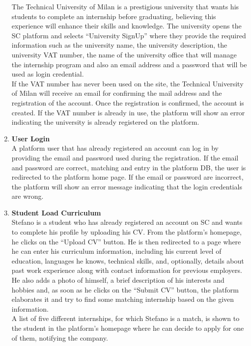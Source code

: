 \begin{enumerate}
        The Technical University of Milan is a prestigious university that wants his students to complete an internship before graduating, believing this experience will enhance their skills and knowledge. The university opens the SC platform and selects “University SignUp” where they provide the required information such as the university name, the university description, the university VAT number, the name of the university office that will manage the internship program and also an email address and a password that will be used as login credential.\\
        If the VAT number has never been used on the site, the Technical University of Milan will receive an email for confirming the mail address and the registration of the account. Once the registration is confirmed, the account is created.
        If the VAT number is already in use, the platform will show an error indicating the university is already registered on the platform.
    \item \textbf{\textcolor{titleColor}{User Login}}\\
        A platform user that has already registered an account can log in by providing the email and password used during the registration. If the email and password are correct, matching and entry in the platform DB, the user is redirected to the platform home page. If the email or password are incorrect, the platform will show an error message indicating that the login credentials are wrong.
    \item \textbf{\textcolor{titleColor}{Student Load Curriculum}}\\
        Stefano is a student who has already registered an account on SC and wants to complete his profile by uploading his CV. From the platform's homepage, he clicks on the “Upload CV” button. He is then redirected to a page where he can enter his curriculum information, including his current level of education, languages he knows, technical skills, and, optionally, details about past work experience along with contact information for previous employers.
        He also adds a photo of himself, a brief description of his interests and hobbies and, as soon as he clicks on the “Submit CV” button, the platform elaborates it and try to find some matching internship based on the given information.\\
        A list of five different internships, for which Stefano is a match, is shown to the student in the platform's homepage where he can decide to apply for one of them, notifying the company.

\end{enumerate}
